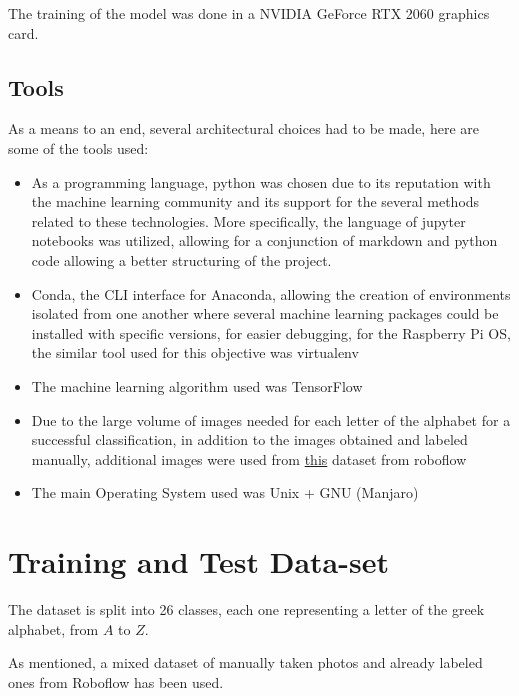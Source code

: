 \documentclass[10pt]{article}
\begin{document}
		The training of the model was done in a NVIDIA GeForce RTX 2060 graphics card.

	\subsection{Tools}

		As a means to an end, several architectural choices had to be made, here are some of the tools used:
		\begin{itemize}
			\item As a programming language, python was chosen due to its reputation with the machine learning community and its support for the several methods related to these technologies. More specifically, the language of jupyter notebooks was utilized, allowing for a conjunction of markdown and python code allowing a better structuring of the project.
			\item Conda, the CLI interface for Anaconda, allowing the creation of environments isolated from one another where several machine learning packages could be installed with specific versions, for easier debugging, for the Raspberry Pi OS, the similar tool used for this objective was virtualenv \cite{2}
			\item The machine learning algorithm used was TensorFlow \cite{3}
			\item Due to the large volume of images needed for each letter of the alphabet for a successful classification, in addition to the images obtained and labeled manually, additional images were used from \href{https://public.roboflow.com/object-detection/american-sign-language-letters/1}{this} dataset from roboflow \cite{4}
			\item The main Operating System used was Unix + GNU (Manjaro)
		\end{itemize}

\section{Training and Test Data-set}\label{sec:3}

	The dataset is split into 26 classes, each one representing a letter of the greek alphabet, from $A$ to $Z$.

	As mentioned, a mixed dataset of manually taken photos and already labeled ones from Roboflow\cite{4} has been used.
\end{document}
